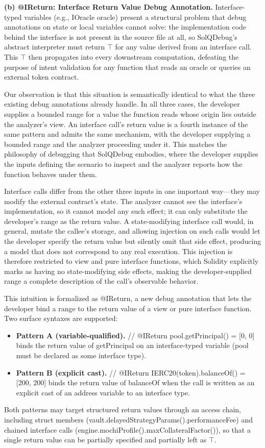 \documentclass[pdflatex,sn-basic]{sn-jnl}%
\theoremstyle{thmstyleone}%
\theoremstyle{thmstyletwo}%
\theoremstyle{thmstylethree}%
\begin{document}
\smallskip
\noindent\textbf{(b) @IReturn: Interface Return Value Debug Annotation.}
Interface-typed variables (e.g., IOracle oracle) present a structural problem that debug annotations on state or local variables cannot solve: the implementation code behind the interface is not present in the source file at all, so SolQDebug's abstract interpreter must return $\top$ for any value derived from an interface call.
This $\top$ then propagates into every downstream computation, defeating the purpose of intent validation for any function that reads an oracle or queries an external token contract.

Our observation is that this situation is semantically identical to what the three existing debug annotations already handle.
In all three cases, the developer supplies a bounded range for a value the function reads whose origin lies outside the analyzer's view.
An interface call's return value is a fourth instance of the same pattern and admits the same mechanism, with the developer supplying a bounded range and the analyzer proceeding under it.
This matches the philosophy of debugging that SolQDebug embodies, where the developer supplies the inputs defining the scenario to inspect and the analyzer reports how the function behaves under them.

Interface calls differ from the other three inputs in one important way---they may modify the external contract's state.
The analyzer cannot see the interface's implementation, so it cannot model any such effect; it can only substitute the developer's range as the return value.
A state-modifying interface call would, in general, mutate the callee's storage, and allowing injection on such calls would let the developer specify the return value but silently omit that side effect, producing a model that does not correspond to any real execution.
This injection is therefore restricted to view and pure interface functions, which Solidity explicitly marks as having no state-modifying side effects, making the developer-supplied range a complete description of the call's observable behavior.

This intuition is formalized as @IReturn, a new debug annotation that lets the developer bind a range to the return value of a view or pure interface function.
Two surface syntaxes are supported:
\begin{itemize}
    \item \textbf{Pattern A (variable-qualified).}
    // @IReturn pool.getPrincipal() = [0, 0] binds the return value of getPrincipal on an interface-typed variable (pool must be declared as some interface type).
    \item \textbf{Pattern B (explicit cast).}
    // @IReturn IERC20(token).balanceOf() = [200, 200] binds the return value of balanceOf when the call is written as an explicit cast of an address variable to an interface type.
\end{itemize}
Both patterns may target structured return values through an access chain, including struct members (vault.delayedStrategyParams().performanceFee) and chained interface calls (engine.mochiProfile().maxCollateralFactor()), so that a single return value can be partially specified and partially left as $\top$.
\end{document}
